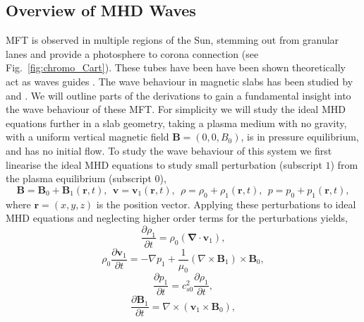 \documentclass[12pt]{ociamthesis}
\newcommand{\bs}[1]{\boldsymbol{#1}}
\newcommand{\bn}{\boldsymbol{\nabla}}
\begin{document}
\subsection{Overview of MHD Waves}
\label{section:mhd_Waves}
MFT is observed in multiple regions of the Sun, stemming out from granular lanes and provide a photosphere to corona connection (see Fig.~\ref{fig:chromo_Cart}). These tubes have been have been shown theoretically act as waves guides \citep{Roberts1981SoPh6939R, Edwin1982SoPh76239E, Roberts1990IAUS142159R, Goossens1992SoPh138233G, Goossens2009AA503213G, Murawski2015AA577A126M, Allcock2017SoPh29235A}. The wave behaviour in magnetic slabs has been studied by \cite{Roberts1981SoPh6939R} and \cite{Edwin1982SoPh76239E}. We will outline parts of the derivations to gain a fundamental insight into the wave behaviour of these MFT. For simplicity we will study the ideal MHD equations further in a slab geometry, taking a plasma medium with no gravity, with a uniform vertical magnetic field $\bs{B}=(0,0,B_0)$, is in pressure equilibrium, and has no initial flow. To study the wave behaviour of this system we first linearise the ideal MHD equations to study small perturbation (subscript $1$) from the plasma equilibrium (subscript $0$), 
\begin{equation} \label{eq91}
\boldsymbol{B} = \boldsymbol{B}_0 + \boldsymbol{B}_1 (\boldsymbol{r},t) , \ \ \boldsymbol{v} = \boldsymbol{v}_1 (\boldsymbol{r}, t) , \ \ \rho = \rho_0 + \rho_1 ( \boldsymbol{r},t) , \ \ p = p_0 + p_1 ( \boldsymbol{r}, t) ,
\end{equation}
where $\bs{r} = (x,y,z)$ is the position vector. Applying these perturbations to ideal MHD equations and neglecting higher order terms for the perturbations yields,
\begin{equation}\label{mhd_lin1}
\frac{\partial \rho_1}{\partial t} = \rho_0 ( \bn \cdot \boldsymbol{v}_1),
\end{equation}
\begin{equation}
\rho_0 \frac{\partial \boldsymbol{v}_1}{\partial t}  = - \nabla p_1 + \frac{1}{\mu_0} (\nabla \times \boldsymbol{B}_1) \times \boldsymbol{B}_0,
\end{equation}
\begin{equation}
\frac{\partial p_1}{\partial t} = c^2_{s0}  \frac{\partial \rho_1}{ \partial t},
\end{equation}
\begin{equation}
\frac{\partial \boldsymbol{B}_1}{\partial t} = \nabla \times (\boldsymbol{v}_1 \times \boldsymbol{B}_0),
\end{equation}
\end{document}
